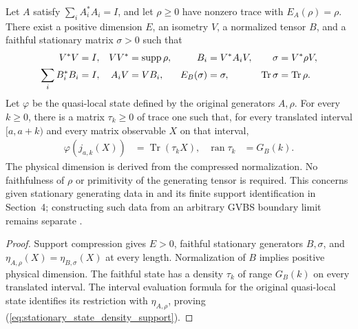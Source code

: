 \begin{lemma}
    \label{thm:stationary_state_local_density_support}
    \leanok
    Let $A$ satisfy $\sum_iA_i^*A_i=I$, and let $\rho\geq0$ have nonzero
    trace with $E_A(\rho)=\rho$. There exist a positive dimension $E$, an
    isometry $V$, a normalized tensor $B$, and a faithful stationary matrix
    $\sigma>0$ such that
    \begin{align}
        V^*V                    & =I,                           & VV^*   & =\operatorname{supp}\rho, &
        B_i                     & =V^*A_iV,                     & \sigma & =V^*\rho V,\notag           \\
        \sum_iB_i^*B_i          & =I,                           & A_iV   & =VB_i,                    &
        E_B(\sigma)             & =\sigma,                      &
        \operatorname{Tr}\sigma & =\operatorname{Tr}\rho.\notag
    \end{align}
    Let $\varphi$ be the quasi-local state defined by the original
    generators $A,\rho$. For every $k\geq0$, there is a matrix
    $\tau_k\geq0$ of trace one such that, for every translated interval
    $[a,a+k)$ and every matrix observable $X$ on that interval,
    \begin{align}
        \varphi(j_{a,k}(X))      & =\operatorname{Tr}(\tau_kX), &
        \operatorname{ran}\tau_k & =G_B(k).
        \label{eq:stationary_state_density_support}
    \end{align}
    The physical dimension is derived from the compressed normalization.
    No faithfulness of $\rho$ or primitivity of the generating tensor is
    required. This concerns given stationary generating data in
    \cite[Section~3]{Nachtergaele1996Spectral} and its finite support
    identification in Section~4; constructing such data from an arbitrary
    GVBS boundary limit remains separate
    \cite{gap:nachtergaele96_infinite_volume_ground_projection}.
\end{lemma}
\begin{proof}\leanok
    Support compression gives $E>0$, faithful stationary generators
    $B,\sigma$, and $\eta_{A,\rho}(X)=\eta_{B,\sigma}(X)$ at every length.
    Normalization of $B$ implies positive physical dimension. The faithful
    state has a density $\tau_k$ of range $G_B(k)$ on every translated
    interval. The interval evaluation formula for the original quasi-local
    state identifies its restriction with $\eta_{A,\rho}$, proving
    (\ref{eq:stationary_state_density_support}).
\end{proof}

